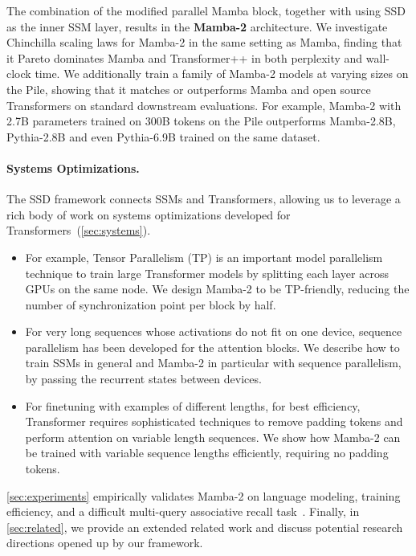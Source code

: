 The combination of the modified parallel Mamba block, together with using SSD as the inner SSM layer, results in the \textbf{Mamba-2} architecture. We investigate Chinchilla scaling laws for Mamba-2 in the same setting as Mamba, finding that it Pareto dominates Mamba and Transformer++ in both perplexity and wall-clock time. We additionally train a family of Mamba-2 models at varying sizes on the Pile, showing that it matches or outperforms Mamba and open source Transformers on standard downstream evaluations. For example, Mamba-2 with 2.7B parameters trained on 300B tokens on the Pile outperforms Mamba-2.8B, Pythia-2.8B and even Pythia-6.9B trained on the same dataset.

\paragraph{Systems Optimizations.} The SSD framework connects SSMs and Transformers, allowing us to leverage a rich body of work on systems optimizations developed for Transformers~(\ref{sec:systems}).

\begin{itemize}[leftmargin=*,itemsep=0pt,topsep=0pt]
  \item For example, Tensor Parallelism (TP) is an important model parallelism technique to train large Transformer models by splitting each layer across GPUs on the same node. We design Mamba-2 to be TP-friendly, reducing the number of synchronization point per block by half.
  \item For very long sequences whose activations do not fit on one device, sequence parallelism has been developed for the attention blocks. We describe how to train SSMs in general and Mamba-2 in particular with sequence parallelism, by passing the recurrent states between devices.
  \item For finetuning with examples of different lengths, for best efficiency, Transformer requires sophisticated techniques to remove padding tokens and perform attention on variable length sequences. We show how Mamba-2 can be trained with variable sequence lengths efficiently, requiring no padding tokens.
\end{itemize}

\ref{sec:experiments} empirically validates Mamba-2 on language modeling, training efficiency, and a difficult multi-query associative recall task~\citep{arora2024simple}.
Finally, in \ref{sec:related}, we provide an extended related work and discuss potential research directions opened up by our framework.

